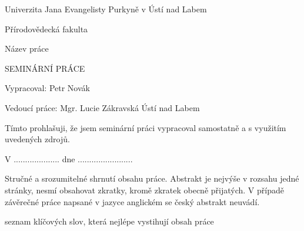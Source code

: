 \documentclass[12pt,a4paper,oneside]{article}
\begin{document}
\pagestyle{empty} %

\begin{center}
\Large
Univerzita Jana Evangelisty Purkyně
v Ústí nad Labem

Přírodovědecká fakulta

\vspace*{\fill}

\Huge
Název práce

\Large
SEMINÁRNÍ PRÁCE

\vspace{4em}
\vspace*{\fill}

\end{center}

{\setlength\parindent{0pt} %
Vypracoval: Petr Novák

Vedoucí práce: Mgr. Lucie Zákravská
\hfill Ústí nad Labem \the\year}

\clearpage

\vspace*{\fill}

Tímto prohlašuji, že jsem seminární práci vypracoval samostatně
a s využitím uvedených zdrojů. %

V .................... dne ........................
   
\hspace{8.5cm} \makebox[2in]{\hrulefill}
  				 
\hspace{8.5cm} 	

\clearpage

{
	\abstract
	\noindent
	Stručné a srozumitelné shrnutí obsahu práce. Abstrakt je nejvýše v rozsahu
	jedné stránky, nesmí obsahovat zkratky, kromě zkratek obecně přijatých. V
	případě závěrečné práce napsané v jazyce anglickém se český abstrakt
	neuvádí.
}

{
	\renewcommand{\abstractname}{Klíčová slova}
	\abstract
	\noindent
	seznam klíčových slov, která nejlépe vystihují obsah práce
}

\clearpage

\tableofcontents
\clearpage

\pagestyle{fancy}

\lipsum

\clearpage
\printbibliography
\end{document}
